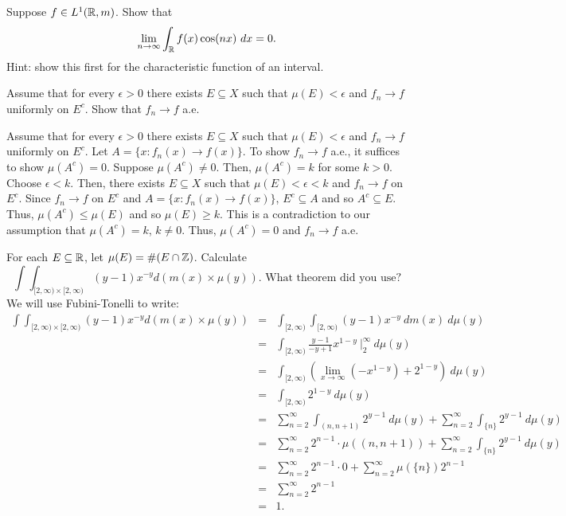 \begin{list}
 \item Suppose $f \in L^1({\mathbb R}, m)$. Show that \[
 \lim_{n \rightarrow \infty}\int_{\mathbb R} f(x) \cos(nx)\ dx = 0. 
 \]
 Hint: show this first for the characteristic function of an interval.
 \item Assume that for every $\epsilon>0$ there exists $E \subseteq X$ such that $\mu(E)< \epsilon$ and $f_n \rightarrow f$ uniformly on $E^c$. Show that $f_n \rightarrow f$ a.e.
 \begin{pf}
 Assume that for every $\epsilon>0$ there exists $E \subseteq X$ such that $\mu(E)< \epsilon$ and $f_n \rightarrow f$ uniformly on $E^c$. Let $A = \{ x : f_n(x) \rightarrow f(x) \}$. To show $f_n \rightarrow f$ a.e., it suffices to show $\mu(A^c) = 0$. Suppose $\mu(A^c) \neq 0$. Then, $\mu(A^c)=k$ for some $k>0$. Choose $\epsilon<k$. Then, there exists $E \subseteq X$ such that $\mu(E)<\epsilon< k$ and $f_n \rightarrow f$ on $E^c$. Since $f_n \rightarrow f$ on $E^c$ and $A = \{ x : f_n(x) \rightarrow f(x) \}$, $E^c \subseteq A$ and so $A^c \subseteq E$. Thus, $\mu(A^c) \leq \mu(E)$ and so $\mu(E) \geq k$. This is a contradiction to our assumption that $\mu(A^c) = k$, $k \neq 0$. Thus, $\mu(A^c) =0$ and $f_n \rightarrow f$ a.e.
  \end{pf}

 \item For each $E \subseteq {\mathbb R}$, let $\mu(E)=\#(E\cap {\mathbb Z})$. Calculate
 \[
 \int \int_{[2, \infty)\times[2, \infty)}(y-1)x^{-y}d(m(x)\times \mu(y)). \text{ What theorem did you use?}
 \]
 We will use Fubini-Tonelli to write: \begin{eqnarray*}
 \int \int_{[2, \infty)\times[2, \infty)}(y-1)x^{-y}d(m(x)\times \mu(y))& = & \int_{[2, \infty)} \int_{[2, \infty)}(y-1)x^{-y} \ dm(x) \ d \mu(y)\\
 & = & \int_{[2, \infty)}\frac{y-1}{-y+1} x^{1-y} \ \biggr\rvert_2^\infty \ d\mu(y) \\
 & = & \int_{[2, \infty)} \left(  \lim_{x \rightarrow \infty}(-x^{1-y}) +2^{1-y} \right) \ d \mu(y)\\
  & = & \int_{[2, \infty)}   2^{1-y}  \ d \mu(y)\\
  & = & \sum_{n=2}^\infty \int_{(n, n+1)} 2^{y-1} \ d \mu(y) + \sum_{n=2}^ \infty \int_{\{n\}} 2^{y-1} \ d\mu(y) \\
  & = & \sum_{n=2}^\infty 2^{n-1} \cdot \mu((n, n+1))  + \sum_{n=2}^ \infty \int_{\{n\}} 2^{y-1} \ d\mu(y) \\
    & = & \sum_{n=2}^\infty  2^{n-1} \cdot 0  + \sum_{n=2}^ \infty \mu(\{n\}) 2^{n-1}  \\
    & = & \sum_{n=2}^ \infty 2^{n-1}  \\
    & = & 1.
 \end{eqnarray*}
 

\end{list}
